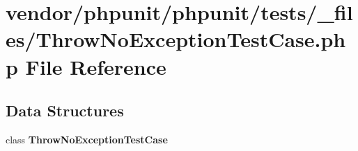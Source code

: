 \section{vendor/phpunit/phpunit/tests/\+\_\+files/\+Throw\+No\+Exception\+Test\+Case.php File Reference}
\label{_throw_no_exception_test_case_8php}
\subsection*{Data Structures}
\begin{DoxyCompactItemize}
\item 
class {\bf Throw\+No\+Exception\+Test\+Case}
\end{DoxyCompactItemize}
